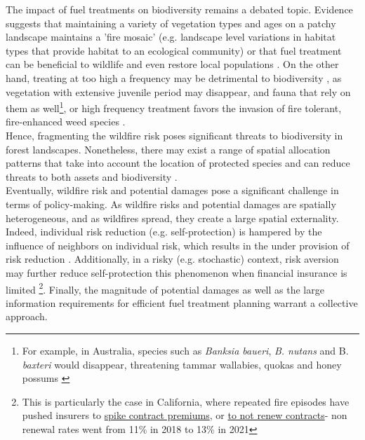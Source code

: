 The impact of fuel treatments on biodiversity remains a debated topic. 
Evidence suggests that maintaining a variety of vegetation types and ages on a patchy landscape maintains a 'fire mosaic' \citep{Sitters2015} (e.g. landscape level variations in habitat types that provide habitat to an ecological community) or that fuel treatment can be beneficial to wildlife \citep{saab_short-term_2022, loeb_bats_2021} and even restore local populations \citep{Templeton2011}. On the other hand, treating at too high a frequency may be detrimental to biodiversity \citep{bradshaw2018}, as vegetation with extensive juvenile period may disappear, and fauna that rely on them as well\footnote{For example, in Australia, species such as \textit{Banksia baueri}, \textit{B. nutans} and B. \textit{baxteri} would disappear, threatening tammar wallabies, quokas and honey possums \citep{bradshaw2018}}, or high frequency treatment favors the invasion of fire tolerant, fire-enhanced weed species \citep{vanWilgen_fire_2013}. 
%
\\
Hence, fragmenting the wildfire risk poses significant threats to biodiversity in forest landscapes. Nonetheless, there may exist a range of spatial allocation patterns that take into account the location of protected species and can reduce threats to both assets and biodiversity \citep{ager_modeling_2007, king_relative_2008, rachmawati_fuel_2018}. 
\\
\hspace*{1.5em}Eventually, wildfire risk and potential damages pose a significant challenge in terms of policy-making. As wildfire risks and potential damages are spatially heterogeneous, and as wildfires spread, they create a large spatial externality. Indeed, individual risk reduction (e.g. self-protection) is hampered by the influence of neighbors on individual risk, which results in the under provision of risk reduction \citep{SHAFRAN2008488, costello_private_2017}. Additionally, in a risky (e.g. stochastic) context, risk aversion may further reduce self-protection this phenomenon when financial insurance is limited \citep{ehrlich_market_1972}\footnote{This is particularly the case in California, where repeated fire episodes have pushed insurers to \href{https://calmatters.org/economy/2024/05/california-insurance-mitigation/}{spike contract premiums}, or \href{https://www.nbclosangeles.com/news/california-wildfires/state-farm-california-los-angeles-homeowners-insurance-policy/3383583/}{to not renew contracts}- non renewal rates went from 11\% in 2018 to 13\% in 2021}. Finally, the magnitude of potential damages \citep{costello_private_2017} as well as the large information requirements for efficient fuel treatment planning warrant a collective approach.
